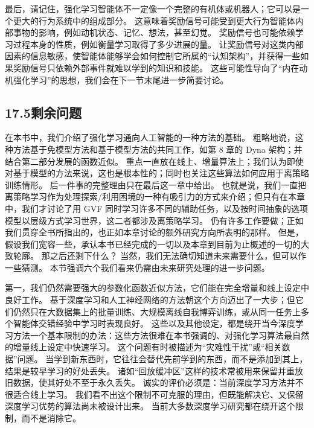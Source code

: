 \documentclass[UTF8, 12pt, fontset=fandol, oneside]{ctexart}
\begin{document}
最后，请记住，强化学习智能体不一定像一个完整的有机体或机器人；它可以是一个更大的行为系统中的组成部分。
这意味着奖励信号可能受到更大行为智能体内部事物的影响，例如动机状态、记忆、想法，甚至幻觉。
奖励信号也可能依赖学习过程本身的性质，例如衡量学习取得了多少进展的量。
让奖励信号对这类内部因素的信息敏感，使智能体能够学会如何控制它所属的“认知架构”，并获得一些如果奖励信号只依赖外部事件就难以学到的知识和技能。
这些可能性导向了“内在动机强化学习”的思想，我们会在下一节末尾进一步简要讨论。

\subsection*{17.5\quad 剩余问题}

在本书中，我们介绍了强化学习通向人工智能的一种方法的基础。
粗略地说，这种方法基于免模型方法和基于模型方法的共同工作，如第 8 章的 Dyna 架构；并结合第二部分发展的函数近似。
重点一直放在线上、增量算法上；我们认为即使对基于模型的方法来说，这也是根本性的；同时也关注这些算法如何应用于离策略训练情形。
后一件事的完整理由只在最后这一章中给出。
也就是说，我们一直把离策略学习作为处理探索/利用困境的一种有吸引力的方式来介绍；但只有在本章中，我们才讨论了用 GVF 同时学习许多不同的辅助任务，以及按时间抽象的选项模型以层级方式学习世界，这二者都涉及离策略学习。
仍有许多工作要做；正如我们贯穿全书所指出的，也正如本章讨论的额外研究方向所表明的那样。
但是，假设我们宽容一些，承认本书已经完成的一切以及本章到目前为止概述的一切的大致轮廓。
那之后还剩下什么？
当然，我们无法确切知道未来需要什么，但可以作一些猜测。
本节强调六个我们看来仍需由未来研究处理的进一步问题。

第一，我们仍然需要强大的参数化函数近似方法，它们能在完全增量和线上设定中良好工作。
基于深度学习和人工神经网络的方法朝这个方向迈出了一大步；但它们仍然只在大数据集上的批量训练、大规模离线自我博弈训练，或从同一任务上多个智能体交错经验中学习时表现良好。
这些以及其他设定，都是绕开当今深度学习方法一个基本限制的办法：这些方法很难在本书强调的、对强化学习算法最自然的增量线上设定中快速学习。
这个问题有时被描述为“灾难性干扰”或“相关数据”问题。
当学到新东西时，它往往会替代先前学到的东西，而不是添加到其上，结果是较早学习的好处丢失。
诸如“回放缓冲区”这样的技术常被用来保留并重放旧数据，使其好处不至于永久丢失。
诚实的评价必须是：当前深度学习方法并不很适合线上学习。
我们看不出这个限制不可克服的理由，但既能解决它、又保留深度学习优势的算法尚未被设计出来。
当前大多数深度学习研究都在绕开这个限制，而不是消除它。
\end{document}
